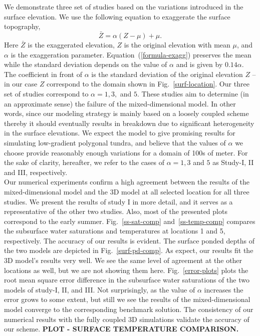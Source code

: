 \documentclass[review]{elsarticle}
\begin{document}
We demonstrate three set of studies based on the variations introduced in the surface elevation. We use the following equation to exaggerate the surface topography,
\begin{equation}\label{formula-exagg}
\bar{Z} =  \alpha (Z - \mu) + \mu.
\end{equation}
Here $\bar{Z}$ is the exaggerated elevation, $Z$ is the original elevation with mean $\mu$, and $\alpha$ is the exaggeration parameter. Equation~(\ref{formula-exagg})  preserves the mean while the standard deviation depends on the value of $\alpha$ and is given by $0.14 \alpha$. The coefficient in front of $\alpha$ is the standard deviation of the original elevation $Z$ -- in our case $Z$ correspond to the domain shown in Fig.~\ref{surf-location}. Our three set of studies correspond to $\alpha=1,3,$ and $5$.
These studies aim to determine (in an approximate sense) the failure of the mixed-dimensional model. In other words, since our modeling strategy is mainly based on a loosely coupled scheme thereby it should eventually results in breakdown due to significant heterogeneity in the surface elevations. We expect the model to give promising results for simulating low-gradient polygonal tundra, and believe that the values of $\alpha$ we choose provide reasonably enough variations for a domain of 100s of meter. For the sake of clarity, hereafter, we refer to the cases of $\alpha = 1, 3$ and $5$ as Study-I, II and III, respectively. \\
Our numerical experiments confirm a high agreement between the results of the mixed-dimensional model and the 3D model at all selected location for all three studies. We present the results of study I in more detail, and it serves as a representative of the other two studies. Also, most of the presented plots correspond to the early summer. Fig.~\ref{ss-sat-comp} and~\ref{ss-temp-comp} compares the subsurface water saturations and temperatures at locations 1 and 5, respectively. The accuracy of our results is evident. The surface ponded depths of the two models are depicted in Fig.~\ref{surf-pd-comp}. As expect, our results fit the 3D model's results very well. We see the same level of agreement at the other locations as well, but we are not showing them here.
Fig.~\ref{error-plots} plots the root mean square error difference in the subsurface water saturations of the two models of study-I, II, and III. Not surprisingly, as the value of $\alpha$ increases the error grows to some extent, but still we see the results of the mixed-dimensional model converge to the corresponding benchmark solution. The consistency of our numerical results with the fully coupled 3D simulations validate the accuracy of our scheme.
\textbf{PLOT - SURFACE TEMPERATURE COMPARISON.}
\end{document}
